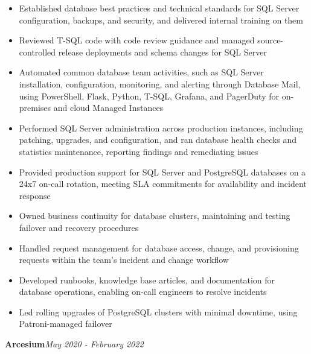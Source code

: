 \documentclass[10pt,a4paper]{article}
\begin{document}
\begin{itemize}
  \item Established database best practices and technical standards for SQL Server configuration, backups, and security, and delivered internal training on them
  \item Reviewed T-SQL code with code review guidance and managed source-controlled release deployments and schema changes for SQL Server
  \item Automated common database team activities, such as SQL Server installation, configuration, monitoring, and alerting through Database Mail, using PowerShell, Flask, Python, T-SQL, Grafana, and PagerDuty for on-premises and cloud Managed Instances
  \item Performed SQL Server administration across production instances, including patching, upgrades, and configuration, and ran database health checks and statistics maintenance, reporting findings and remediating issues
  \item Provided production support for SQL Server and PostgreSQL databases on a 24x7 on-call rotation, meeting SLA commitments for availability and incident response
  \item Owned business continuity for database clusters, maintaining and testing failover and recovery procedures
  \item Handled request management for database access, change, and provisioning requests within the team's incident and change workflow
  \item Developed runbooks, knowledge base articles, and documentation for database operations, enabling on-call engineers to resolve incidents
  \item Led rolling upgrades of PostgreSQL clusters with minimal downtime, using Patroni-managed failover
\end{itemize}
\vspace{14.7pt}
\noindent\textbf{Arcesium}\hfill \textit{May 2020 - February 2022}
\end{document}
